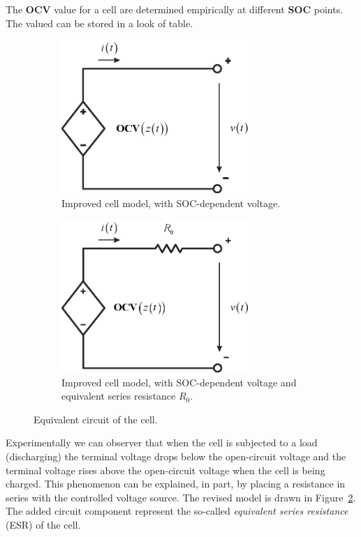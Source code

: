 \documentclass[11pt,a4paper,oneside]{book}
\numberwithin{equation}{section}
\theoremstyle{it}
\theoremstyle{definition}
\begin{document}
The $\mathbf{OCV}$ value for a cell are determined empirically at different $\mathbf{SOC}$ points. The valued can be stored in a look of table. 
\begin{figure}[H]
	\centering
	\begin{subfigure}{.5\textwidth}
		\centering
		\includegraphics[width = 200pt, keepaspectratio]{figures/lithium_ion_battery/cell_eq_circuit_1.eps}
		\captionsetup{width=0.75\textwidth}		
		\caption{Improved cell model, with SOC-dependent voltage.}
		\label{OCV_soc_2}
	\end{subfigure}%
	\begin{subfigure}{.5\textwidth}
		\centering
		\includegraphics[width = 200pt, keepaspectratio]{figures/lithium_ion_battery/cell_eq_circuit_2.eps}
		\captionsetup{width=0.75\textwidth}		
		\caption{Improved cell model, with SOC-dependent voltage and equivalent series resistance $R_0$.}
		\label{OCV_soc_3}
	\end{subfigure}
	\caption{Equivalent circuit of the cell.}
	\label{}
\end{figure}
Experimentally we can observer that when the cell is subjected to a load (discharging) the terminal voltage drops below the open-circuit voltage and the terminal voltage rises above the open-circuit voltage when the cell is being charged. This phenomenon can be explained, in part, by placing a resistance in series with the controlled voltage source. The revised model is drawn in Figure~\ref{OCV_soc_3}. The added circuit component represent the so-called \textit{equivalent series resistance} (ESR) of the cell.
\end{document}
